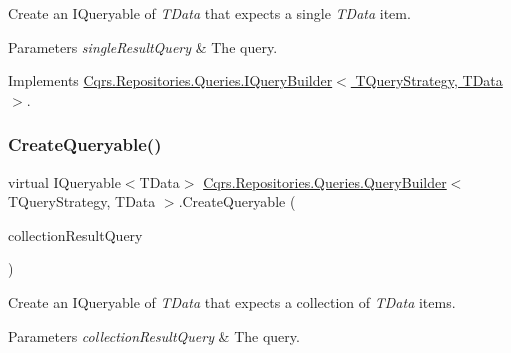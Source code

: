 Create an I\+Queryable of {\itshape T\+Data}  that expects a single {\itshape T\+Data}  item. 


\begin{DoxyParams}{Parameters}
{\em single\+Result\+Query} & The query.\\
\hline
\end{DoxyParams}


Implements \hyperlink{interfaceCqrs_1_1Repositories_1_1Queries_1_1IQueryBuilder_a83cb87d485491c6d38fe8fa6fd649373_a83cb87d485491c6d38fe8fa6fd649373}{Cqrs.\+Repositories.\+Queries.\+I\+Query\+Builder$<$ T\+Query\+Strategy, T\+Data $>$}.

\mbox{\label{classCqrs_1_1Repositories_1_1Queries_1_1QueryBuilder_af8860edf3677cb80ae481f17ff2db9b5_af8860edf3677cb80ae481f17ff2db9b5}} 
\subsubsection{\texorpdfstring{Create\+Queryable()}{CreateQueryable()}\hspace{0.1cm}{\footnotesize\ttfamily [2/2]}}
{\footnotesize\ttfamily virtual I\+Queryable$<$T\+Data$>$ \hyperlink{classCqrs_1_1Repositories_1_1Queries_1_1QueryBuilder}{Cqrs.\+Repositories.\+Queries.\+Query\+Builder}$<$ T\+Query\+Strategy, T\+Data $>$.Create\+Queryable (\begin{DoxyParamCaption}\item[{\hyperlink{interfaceCqrs_1_1Repositories_1_1Queries_1_1ICollectionResultQuery}{I\+Collection\+Result\+Query}$<$ T\+Query\+Strategy, T\+Data $>$}]{collection\+Result\+Query }\end{DoxyParamCaption})\hspace{0.3cm}{\ttfamily [virtual]}}



Create an I\+Queryable of {\itshape T\+Data}  that expects a collection of {\itshape T\+Data}  items. 


\begin{DoxyParams}{Parameters}
{\em collection\+Result\+Query} & The query.\\
\hline
\end{DoxyParams}


